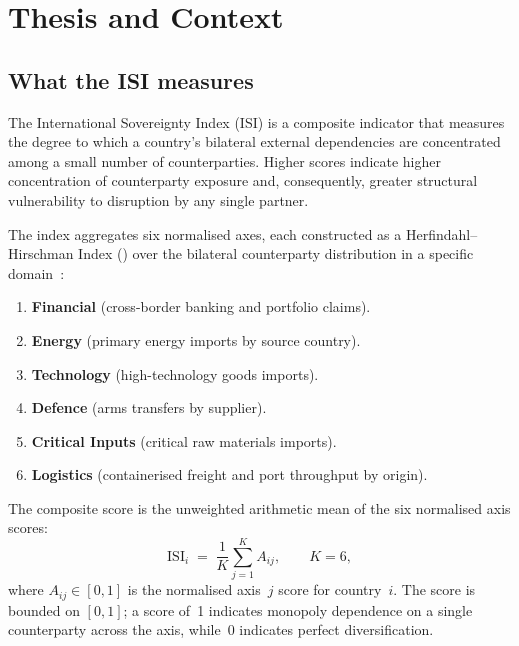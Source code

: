 \section{Thesis and Context}\label{sec:thesis}

\subsection{What the ISI measures}

The International Sovereignty Index (ISI) is a composite indicator that
measures the degree to which a country's bilateral external dependencies
are concentrated among a small number of counterparties.  Higher {\ISI}
scores indicate higher concentration of counterparty exposure and,
consequently, greater structural vulnerability to disruption by any
single partner.

The index aggregates six normalised axes, each constructed as a
Herfindahl--Hirschman Index (\HHI) over the bilateral counterparty
distribution in a specific domain~\cite{isi_paper1}:

\begin{enumerate}[leftmargin=2em]
  \item \textbf{Financial} (cross-border banking and portfolio claims).
  \item \textbf{Energy} (primary energy imports by source country).
  \item \textbf{Technology} (high-technology goods imports).
  \item \textbf{Defence} (arms transfers by supplier).
  \item \textbf{Critical Inputs} (critical raw materials imports).
  \item \textbf{Logistics} (containerised freight and port throughput
        by origin).
\end{enumerate}

\noindent
The composite score is the unweighted arithmetic mean of the six
normalised axis scores:
\begin{equation}\label{eq:composite}
  \text{ISI}_i
  \;=\;
  \frac{1}{K}\sum_{j=1}^{K} A_{ij},
  \qquad K = 6,
\end{equation}
where $A_{ij} \in [0,1]$ is the normalised axis~$j$ score for
country~$i$.  The score is bounded on $[0,1]$; a score of~1
indicates monopoly dependence on a single counterparty across the
axis, while~0 indicates perfect diversification.

